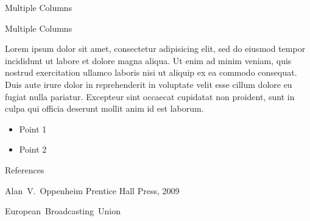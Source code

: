 \documentclass[compress]{beamer}
\begin{document}


\begin{frame}{Multiple Columns}

\end{frame}

\begin{frame}{Multiple Columns}
	\begin{multicols}{2}
		Lorem ipsum dolor sit amet, consectetur adipisicing elit, sed do eiusmod
		tempor incididunt ut labore et dolore magna aliqua. Ut enim ad minim veniam,
		quis nostrud exercitation ullamco laboris nisi ut aliquip ex ea commodo
		consequat. Duis aute irure dolor in reprehenderit in voluptate velit esse
		cillum dolore eu fugiat nulla pariatur. Excepteur sint occaecat cupidatat non
		proident, sunt in culpa qui officia deserunt mollit anim id est laborum.
		\begin{itemize}
        	\item Point 1
        	\item Point 2
		\end{itemize}
	\end{multicols}
\end{frame}

\begin{frame}{References}
	\begin{thebibliography}{10}
    
	\beamertemplatebookbibitems
	Alan~V.~Oppenheim
	\newblock {}
	\newblock Prentice Hall Press, 2009

	\beamertemplatearticlebibitems
	European~Broadcasting~Union
	\newblock {}
  \end{thebibliography}
\end{frame}
\end{document}
